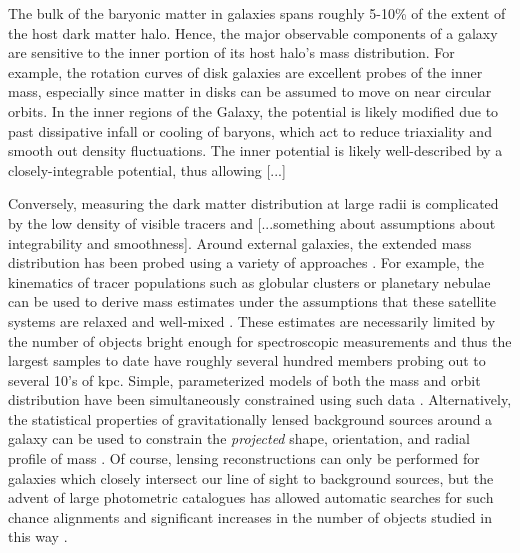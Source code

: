 \documentclass[letterpaper,12pt,preprint]{aastex}
\begin{document}
The bulk of the baryonic matter in galaxies spans roughly 5-10\% of the extent of the host dark matter halo. Hence, the major observable components of a galaxy are sensitive to the inner portion of its host halo's mass distribution. For example, the rotation curves of disk galaxies are excellent probes of the inner mass, especially since matter in disks can be assumed to move on near circular orbits. In the inner regions of the Galaxy, the potential is likely modified due to past dissipative infall \citep{dubinski94} or cooling \citep{bryan13} of baryons, which act to reduce triaxiality and smooth out density fluctuations. The inner potential is likely well-described by a closely-integrable potential, thus allowing [...]


Conversely, measuring the dark matter distribution at large radii is complicated by the low density of visible tracers and [...something about assumptions about integrability and smoothness]. Around external galaxies, the extended mass distribution has been probed using a variety of approaches \citep[see][for a a complete and detailed review]{courteau12}. For example, the kinematics of tracer populations such as globular clusters or planetary nebulae can be used to derive mass estimates under the assumptions that these satellite systems are relaxed and well-mixed \citep[early investigations include][]{mendez01,cote03}. These estimates are necessarily limited by the number of objects bright enough for spectroscopic measurements and thus the largest samples to date have roughly several hundred members probing out to several 10's of kpc. Simple, parameterized models of both the mass and orbit distribution have been simultaneously constrained using such data \citep[e.g.][]{napolitano11,deason12a}. 
Alternatively, the statistical properties of gravitationally lensed background sources around a galaxy can be used to constrain the \emph{projected} shape, orientation, and radial profile of mass \citep[as done by the Lens Structure and Dynamics Survey described in][]{koopmans02}. Of course, lensing reconstructions can only be performed for galaxies which closely intersect our line of sight to background sources, but the advent of large photometric catalogues has allowed automatic searches for such chance alignments and significant increases in the number of objects studied in this way \citep[e.g. the Sloan Lens ACS Survey, see][]{bolton06}.
\end{document}
